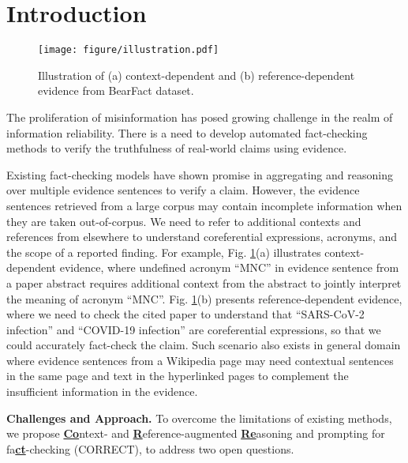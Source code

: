 \section{Introduction}

\begin{figure}[t]
	\centering
	\texttt{[image: figure/illustration.pdf]}
	\caption{Illustration of (a) context-dependent and (b) reference-dependent evidence from BearFact dataset.}
	\label{fig:illustration}
\end{figure}

The proliferation of misinformation has posed growing challenge in the realm of information reliability. There is a need to develop automated fact-checking methods \cite{survey} to verify the truthfulness of real-world claims using evidence.

Existing fact-checking models \cite{gear,kgat} have shown promise in aggregating and reasoning over multiple evidence sentences to verify a claim. However, the evidence sentences retrieved from a large corpus may contain incomplete information when they are taken out-of-corpus. We need to refer to additional contexts and references from elsewhere to understand coreferential expressions, acronyms, and the scope of a reported finding. For example, Fig. \ref{fig:illustration}(a) illustrates context-dependent evidence, where undefined acronym ``MNC'' in evidence sentence from a paper abstract requires additional context from the abstract to jointly interpret the meaning of acronym ``MNC''. Fig. \ref{fig:illustration}(b) presents reference-dependent evidence, where we need to check the cited paper to understand that ``SARS-CoV-2 infection'' and ``COVID-19 infection'' are coreferential expressions, so that we could accurately fact-check the claim. Such scenario also exists in general domain where evidence sentences from a Wikipedia page may need contextual sentences in the same page and text in the hyperlinked pages to complement the insufficient information in the evidence.

\textbf{Challenges and Approach.} To overcome the limitations of existing methods, we propose \ul{\textbf{Co}}ntext- and \ul{\textbf{R}}eference-augmented \ul{\textbf{Re}}asoning and prompting for fa\ul{\textbf{ct}}-checking (CORRECT), to address two open questions.

